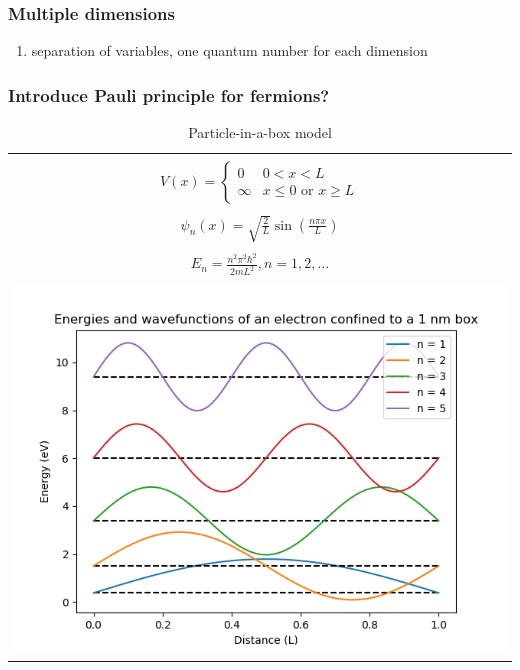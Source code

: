 \documentclass[11pt]{article}
\begin{document}
\subsubsection{Multiple dimensions}
\label{sec:orgbffe134}
\begin{enumerate}
\item separation of variables, one quantum number for each dimension
\end{enumerate}
\subsubsection{Introduce Pauli principle for fermions?}
\label{sec:org7d2913d}

\begin{table}[tb]
   \begin{center}
   \caption{Particle-in-a-box model}
    \label{Particle-in-a-box}
\begin{tabular}[h]{|c|}
\hline
 \\
$\displaystyle       V(x) = \left \{
        \begin{array}{rl}
          0 & 0 < x < L \\
          \infty & x \leq 0 \text{ or } x \geq L
        \end{array} \right . $ \\
 \\
$\displaystyle     \psi_n(x) =\sqrt{\frac{2}{L}} \sin \left ( \frac{n\pi x}{L} \right )$
\\ 
 \\
$\displaystyle     E_n =\frac{n^2\pi^2\hbar^2}{2mL^2}, n = 1, 2, ...$ \\
 \\
     \includegraphics[scale=.5]{Images/PIAB.png} \\       
\hline
\end{tabular}
 \end{center}
\end{table}
\end{document}
